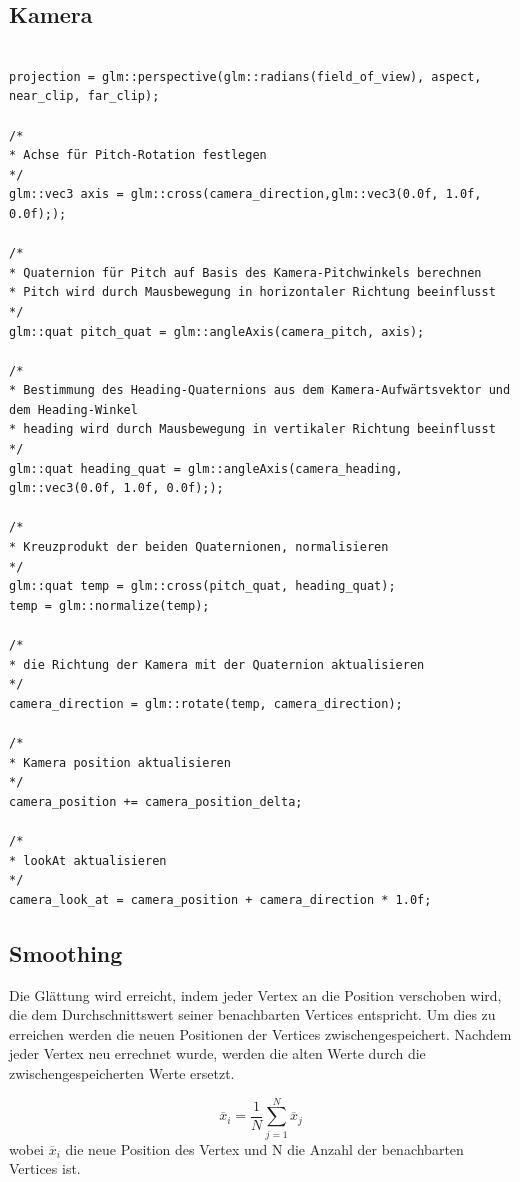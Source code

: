 \subsection{Kamera}

\begin{lstlisting}

projection = glm::perspective(glm::radians(field_of_view), aspect, near_clip, far_clip);

/*
* Achse für Pitch-Rotation festlegen
*/
glm::vec3 axis = glm::cross(camera_direction,glm::vec3(0.0f, 1.0f, 0.0f););

/*
* Quaternion für Pitch auf Basis des Kamera-Pitchwinkels berechnen
* Pitch wird durch Mausbewegung in horizontaler Richtung beeinflusst
*/
glm::quat pitch_quat = glm::angleAxis(camera_pitch, axis);

/*
* Bestimmung des Heading-Quaternions aus dem Kamera-Aufwärtsvektor und dem Heading-Winkel
* heading wird durch Mausbewegung in vertikaler Richtung beeinflusst
*/
glm::quat heading_quat = glm::angleAxis(camera_heading, glm::vec3(0.0f, 1.0f, 0.0f););

/*
* Kreuzprodukt der beiden Quaternionen, normalisieren
*/
glm::quat temp = glm::cross(pitch_quat, heading_quat);
temp = glm::normalize(temp);

/*
* die Richtung der Kamera mit der Quaternion aktualisieren
*/
camera_direction = glm::rotate(temp, camera_direction);

/*
* Kamera position aktualisieren
*/
camera_position += camera_position_delta;

/*
* lookAt aktualisieren
*/
camera_look_at = camera_position + camera_direction * 1.0f;

\end{lstlisting}

\subsection{Smoothing}

Die Glättung wird erreicht, indem jeder Vertex an die Position verschoben wird, die dem Durchschnittswert seiner benachbarten Vertices entspricht. Um dies zu erreichen werden die neuen Positionen der Vertices zwischengespeichert. Nachdem jeder Vertex neu errechnet wurde, werden die alten Werte durch die zwischengespeicherten Werte ersetzt.

\[\overline{x}_i = \frac{1}{N}\sum_{j=1}^{N}\overline{x}_j\]
wobei \(\overline{x}_i\) die neue Position des Vertex und N die Anzahl der benachbarten Vertices ist.

